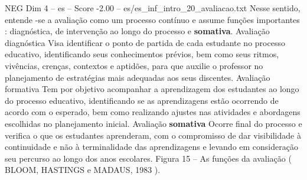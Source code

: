 \begin{textsample}{NEG Dim 4 – es – Score -2.00 – es/es\_inf\_intro\_20\_avaliacao.txt}
Nesse sentido, entende -se a avaliação como um processo contínuo e assume funções importantes : diagnóstica, de intervenção ao longo do processo e \textbf{somativa}.
Avaliação diagnóstica Visa identificar o ponto de partida de cada estudante no processo educativo, identificando seus conhecimentos prévios, bem como seus ritmos, vivências, crenças, contextos e aptidões, para que auxilie o professor no planejamento de estratégias mais adequadas aos seus discentes.
Avaliação formativa Tem por objetivo acompanhar a aprendizagem dos estudantes ao longo do processo educativo, identificando se as aprendizagens estão ocorrendo de acordo com o esperado, bem como realizando ajustes nas atividades e abordagens escolhidas no planejamento inicial.
Avaliação \textbf{somativa} Ocorre final do processo e verifica o que os estudantes aprenderam, com o compromisso de dar visibilidade à continuidade e não à terminalidade das aprendizagens e levando em consideração seu percurso ao longo dos anos escolares.
Figura 15 – As funções da avaliação ( BLOOM, HASTINGS e MADAUS, 1983 ).

\end{textsample}
